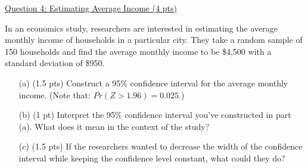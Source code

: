\documentclass{./../../Latex/tests}
\begin{document}
\newpage
\underline{Question 4: Estimating Average Income (4 pts)}

In an economics study, researchers are interested in estimating the average monthly income of households in a particular city. They take a random sample of 150 households and find the average monthly income to be \$4,500 with a standard deviation of \$950.

\begin{enumerate}

\item[(a)] (1.5 pts) Construct a 95\% confidence interval for the average monthly income. (Note that: $Pr(Z>1.96) = 0.025$.)
\vspace{4.5cm}

\item[(b)] (1 pt)  Interpret the 95\% confidence interval you've constructed in part (a). What does it mean in the context of the study?
\vspace{4.5cm}

\item[(c)] (1.5 pts) If the researchers wanted to decrease the width of the confidence interval while keeping the confidence level constant, what could they do? 
\end{enumerate}
\end{document}
